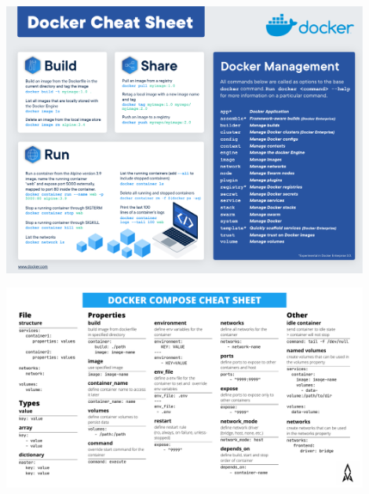 \begin{frame}
\centering\includegraphics[width=0.9\textwidth]{images/docker-cheat-sheet.pdf}
\end{frame}

\begin{frame}
\centering\includegraphics[width=0.9\textwidth]{images/docker-compose-cheat-sheet.pdf}
\end{frame}

